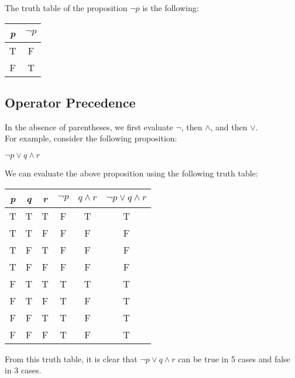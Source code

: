 The truth table of the proposition $\lnot p$ is the following:

\begin{table}[h]
\centering
\begin{tabular}{|c|c|}
\hline
\textit{p} & $\lnot p$ \\ \hline
T          & F     \\ \hline
F          & T     \\ \hline
\end{tabular}
\end{table}

\clearpage

\subsection*{Operator Precedence}

In the absence of parentheses, we first evaluate $\lnot$, then $\land$, and then $\vee$.\\

For example, consider the following proposition:

\begin{center}
    $\lnot p \vee q \land r$
\end{center}

We can evaluate the above proposition using the following truth table:

\begin{table}[h]
\centering
\begin{tabular}{|c|c|c|c|c|c|}
\hline
\textit{p} & \textit{q} & \textit{r} & $\lnot p$ & $q \land r$ & $\lnot p \vee q \land r$ \\ \hline
T          & T          & T          & F     & T       & T                \\ \hline
T          & T          & F          & F     & F       & F                \\ \hline
T          & F          & T          & F     & F       & F                \\ \hline
T          & F          & F          & F     & F       & F                \\ \hline
F          & T          & T          & T     & T       & T                \\ \hline
F          & T          & F          & T     & F       & T                \\ \hline
F          & F          & T          & T     & F       & T                \\ \hline
F          & F          & F          & T     & F       & T                \\ \hline
\end{tabular}
\end{table}

From this truth table, it is clear that $\lnot p \vee q \land r$ can be true in 5 cases and false in 3 cases.




